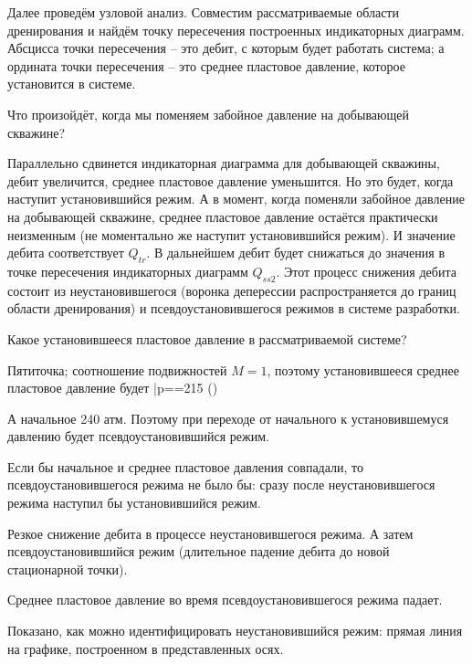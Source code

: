 \documentclass[main.tex]{subfiles}
\begin{document}
Далее проведём узловой анализ. Совместим рассматриваемые области дренирования и найдём точку пересечения построенных индикаторных диаграмм. Абсцисса точки пересечения -- это дебит, с которым будет работать система; а ордината точки пересечения -- это среднее пластовое давление, которое установится в системе.


Что произойдёт, когда мы поменяем забойное давление на добывающей скважине?

Параллельно сдвинется индикаторная диаграмма для добывающей скважины, дебит увеличится, среднее пластовое давление уменьшится. Но это будет, когда наступит установившийся режим. А в момент, когда поменяли забойное давление на добывающей скважине, среднее пластовое давление остаётся практически неизменным (не моментально же наступит установившийся режим). И значение дебита соответствует $Q_{tr}$. В дальнейшем дебит будет снижаться до значения в точке пересечения индикаторных диаграмм $Q_{ss2}$. Этот процесс снижения дебита состоит из неустановившегося (воронка деперессии распространяется до границ области дренирования) и псевдоустановившегося режимов в системе разработки.



Какое установившееся пластовое давление в рассматриваемой системе?

Пятиточка; соотношение подвижностей $M=1$, поэтому установившееся среднее пластовое давление будет
\beq
\bar{p}==215 ()
\eeq

А начальное 240 атм. Поэтому при переходе от начального к установившемуся давлению будет псевдоустановившийся режим.

Если бы начальное и среднее пластовое давления совпадали, то псевдоустановившегося режима не было бы: сразу после неустановившегося режима наступил бы установившийся режим.


Резкое снижение дебита в процессе неустановившегося режима. А затем псевдоустановившийся режим (длительное падение дебита до новой стационарной точки). 


Среднее пластовое давление во время псевдоустановившегося режима падает.


Показано, как можно идентифицировать неустановившийся режим: прямая линия  на графике, построенном в представленных осях.
\end{document}
